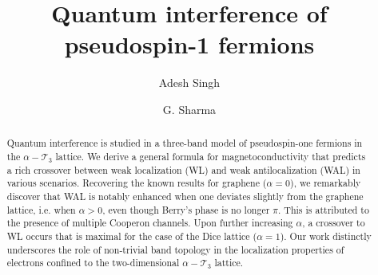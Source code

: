 \documentclass[aps,prb,amsmath,amssymb,footinbib,showpacs,twocolumn]{revtex4-2}
\begin{document}
\title{Quantum interference of pseudospin-1 fermions}

\author{Adesh Singh}
\author{G. Sharma}



\begin{abstract}
Quantum interference is studied in a three-band model of pseudospin-one fermions in the $\alpha-\mathcal{T}_3$ lattice. We derive a general formula for magnetoconductivity that predicts a rich crossover between weak localization (WL) and weak antilocalization (WAL) in various scenarios. Recovering the known results for graphene ($\alpha=0$), we remarkably discover that WAL is notably enhanced when one deviates slightly from the graphene lattice, i.e. when $\alpha>0$, even though Berry's phase is no longer $\pi$. This is attributed to the presence of multiple Cooperon channels. Upon further increasing $\alpha$, a crossover to WL occurs that is maximal for the case of the Dice lattice ($\alpha=1$). Our work distinctly underscores the role of non-trivial band topology in the localization properties of electrons confined to the two-dimensional $\alpha-\mathcal{T}_3$ lattice.
\end{abstract}
\end{document}
